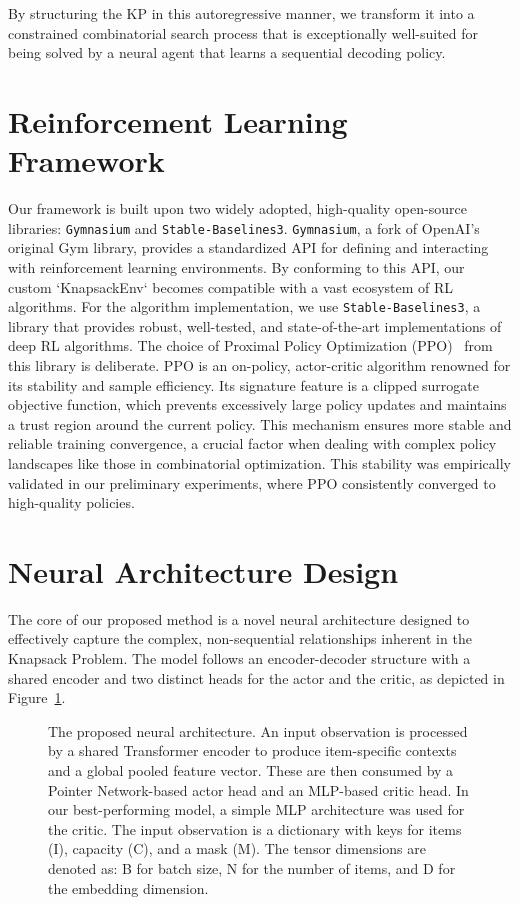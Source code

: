 By structuring the KP in this autoregressive manner, we transform it into a constrained combinatorial search process that is exceptionally well-suited for being solved by a neural agent that learns a sequential decoding policy.

\section{Reinforcement Learning Framework}
Our framework is built upon two widely adopted, high-quality open-source libraries: \texttt{Gymnasium} and \texttt{Stable-Baselines3}.
\texttt{Gymnasium}, a fork of OpenAI's original Gym library, provides a standardized API for defining and interacting with reinforcement learning environments.
By conforming to this API, our custom `KnapsackEnv` becomes compatible with a vast ecosystem of RL algorithms.
For the algorithm implementation, we use \texttt{Stable-Baselines3}, a library that provides robust, well-tested, and state-of-the-art implementations of deep RL algorithms.
The choice of Proximal Policy Optimization (PPO)~\cite{schulmanProximalPolicyOptimization2017} from this library is deliberate.
PPO is an on-policy, actor-critic algorithm renowned for its stability and sample efficiency.
Its signature feature is a clipped surrogate objective function, which prevents excessively large policy updates and maintains a trust region around the current policy.
This mechanism ensures more stable and reliable training convergence, a crucial factor when dealing with complex policy landscapes like those in combinatorial optimization.
This stability was empirically validated in our preliminary experiments, where PPO consistently converged to high-quality policies.

\section{Neural Architecture Design}
The core of our proposed method is a novel neural architecture designed to effectively capture the complex, non-sequential relationships inherent in the Knapsack Problem.
The model follows an encoder-decoder structure with a shared encoder and two distinct heads for the actor and the critic, as depicted in Figure~\ref{fig:model_architecture}.

\begin{figure}[H]
    \centering
    
    \caption{The proposed neural architecture. An input observation is processed by a shared Transformer encoder to produce item-specific contexts and a global pooled feature vector. These are then consumed by a Pointer Network-based actor head and an MLP-based critic head. In our best-performing model, a simple MLP architecture was used for the critic. The input observation is a dictionary with keys for items (I), capacity (C), and a mask (M). The tensor dimensions are denoted as: B for batch size, N for the number of items, and D for the embedding dimension.}
    \label{fig:model_architecture}
\end{figure}

